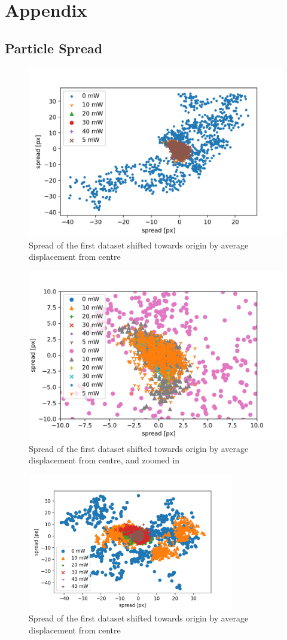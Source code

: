 \section{Appendix}

\subsection{Particle Spread}
\begin{figure}[!ht]
    \centering
    \includegraphics[width=.8\textwidth,keepaspectratio]{figures/spread-dataset1.png}
    \caption{Spread of the first dataset shifted towards origin by average displacement from centre}
\end{figure}
\begin{figure}[!ht]
    \centering
    \includegraphics[width=.8\textwidth,keepaspectratio]{figures/spread-zoom-dataset1.png}
    \caption{Spread of the first dataset shifted towards origin by average displacement from centre, and zoomed in}
\end{figure}
\begin{figure}[!ht]
    \centering
    \includegraphics[width=0.8\textwidth,keepaspectratio]{figures/spread-dataset2.png}
    \caption{Spread of the first dataset shifted towards origin by average displacement from centre}
\end{figure}








